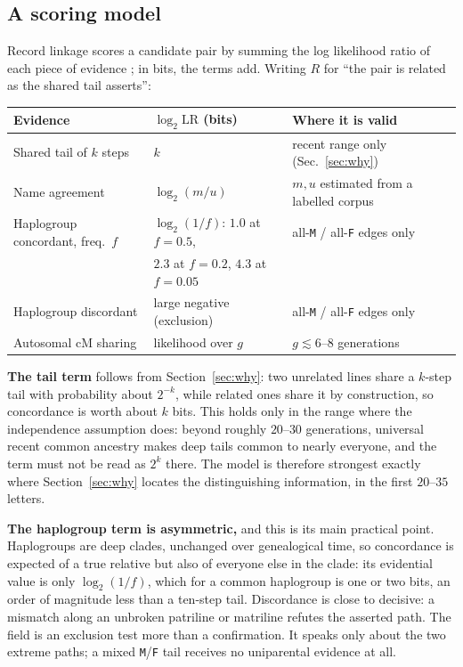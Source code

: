 \documentclass[11pt]{article}
\begin{document}
\subsection{A scoring model}
\label{sec:scoring}
Record linkage scores a candidate pair by summing the log likelihood ratio of each piece of evidence
\cite{fellegi1969}; in bits, the terms add. Writing $R$ for ``the pair is related as the shared tail
asserts'':

\begin{center}
\renewcommand{\arraystretch}{1.2}
\begin{tabular}{@{}lll@{}}
\hline
Evidence & $\log_2 \mathrm{LR}$ (bits) & Where it is valid\\
\hline
Shared tail of $k$ steps      & $k$                       & recent range only (Sec.~\ref{sec:why})\\
Name agreement                & $\log_2(m/u)$             & $m,u$ estimated from a labelled corpus\\
Haplogroup concordant, freq.\ $f$ & $\log_2(1/f)$: $1.0$ at $f{=}0.5$, & all-\texttt{M} / all-\texttt{F} edges only\\
                              & $2.3$ at $f{=}0.2$, $4.3$ at $f{=}0.05$ & \\
Haplogroup discordant         & large negative (exclusion) & all-\texttt{M} / all-\texttt{F} edges only\\
Autosomal cM sharing          & likelihood over $g$        & $g \lesssim 6$--$8$ generations\\
\hline
\end{tabular}
\end{center}

\noindent\textbf{The tail term} follows from Section~\ref{sec:why}: two unrelated lines share a
$k$-step tail with probability about $2^{-k}$, while related ones share it by construction, so
concordance is worth about $k$ bits. This holds only in the range where the independence assumption
does: beyond roughly $20$--$30$ generations, universal recent common ancestry \cite{chang1999,
rohde2004} makes deep tails common to nearly everyone, and the term must not be read as $2^{k}$ there.
The model is therefore strongest exactly where Section~\ref{sec:why} locates the distinguishing
information, in the first $20$--$35$ letters.

\noindent\textbf{The haplogroup term is asymmetric,} and this is its main practical point.
Haplogroups are deep clades, unchanged over genealogical time, so concordance is expected of a true
relative but also of everyone else in the clade: its evidential value is only $\log_2(1/f)$, which for
a common haplogroup is one or two bits, an order of magnitude less than a ten-step tail. Discordance
is close to decisive: a mismatch along an unbroken patriline or matriline refutes the asserted path.
The field is an exclusion test more than a confirmation. It speaks only about the two extreme paths;
a mixed \texttt{M}/\texttt{F} tail receives no uniparental
evidence at all.
\end{document}
